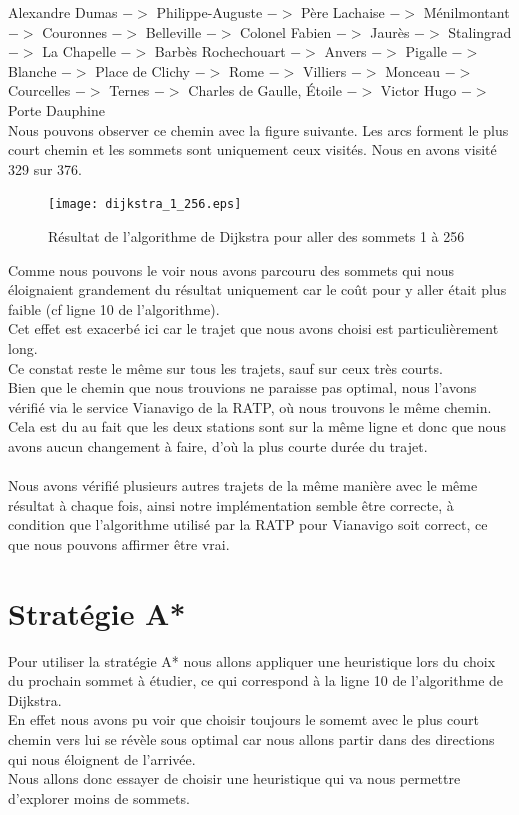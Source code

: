 \documentclass{article}
\begin{document}
Alexandre Dumas
$->$ Philippe-Auguste
$->$ Père Lachaise
$->$ Ménilmontant
$->$ Couronnes
$->$ Belleville
$->$ Colonel Fabien
$->$ Jaurès
$->$ Stalingrad
$->$ La Chapelle
$->$ Barbès Rochechouart
$->$ Anvers
$->$ Pigalle
$->$ Blanche
$->$ Place de Clichy
$->$ Rome
$->$ Villiers
$->$ Monceau
$->$ Courcelles
$->$ Ternes
$->$ Charles de Gaulle, Étoile
$->$ Victor Hugo
$->$ Porte Dauphine\\

Nous pouvons observer ce chemin avec la figure suivante. Les arcs forment le plus court
chemin et les sommets sont uniquement ceux visités. Nous en avons visité 329 sur 376.\\

\begin{figure}[!hbt]
	\centering
		\texttt{[image: dijkstra\_1\_256.eps]}
	\caption{Résultat de l'algorithme de Dijkstra pour aller des sommets 1 à 256}
	\label{dijkstra_1}
\end{figure}

Comme nous pouvons le voir nous avons parcouru des sommets qui nous éloignaient grandement du résultat
uniquement car le coût pour y aller était plus faible (cf ligne 10 de l'algorithme).\\
Cet effet est exacerbé ici car le trajet que nous avons choisi est particulièrement long.\\
Ce constat reste le même sur tous les trajets, sauf sur ceux très courts.\\

Bien que le chemin que nous trouvions ne paraisse pas optimal, nous l'avons vérifié via
le service Vianavigo de la RATP, où nous trouvons le même chemin. Cela est du au fait que
les deux stations sont sur la même ligne et donc que nous avons aucun changement à faire,
d'où la plus courte durée du trajet.\\\\
Nous avons vérifié plusieurs autres trajets de la même manière avec le même résultat à chaque
fois, ainsi notre implémentation semble être correcte, à condition que l'algorithme
utilisé par la RATP pour Vianavigo soit correct, ce que nous pouvons affirmer être vrai.

\pagebreak
\section{Stratégie A*}

Pour utiliser la stratégie A* nous allons appliquer une heuristique lors du choix du prochain
sommet à étudier, ce qui correspond à la ligne 10 de l'algorithme de Dijkstra.\\
En effet nous avons pu voir que choisir toujours le somemt avec le plus court chemin vers lui
se révèle sous optimal car nous allons partir dans des directions qui nous éloignent de l'arrivée.\\
Nous allons donc essayer de choisir une heuristique qui va nous permettre d'explorer moins de sommets.
\end{document}
